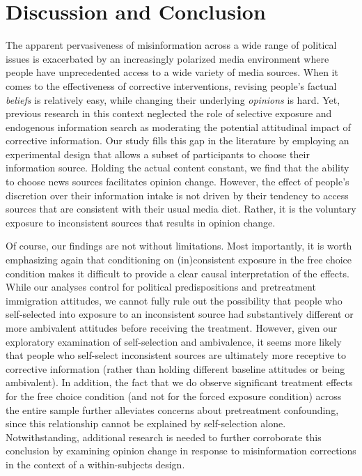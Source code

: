 \documentclass[
  12pt,
]{article}
\begin{document}
\hypertarget{discussion-and-conclusion}{%
\section{Discussion and Conclusion}\label{discussion-and-conclusion}}

The apparent pervasiveness of misinformation across a wide range of
political issues is exacerbated by an increasingly polarized media
environment where people have unprecedented access to a wide variety of
media sources. When it comes to the effectiveness of corrective
interventions, revising people's factual \emph{beliefs} is relatively
easy, while changing their underlying \emph{opinions} is hard. Yet,
previous research in this context neglected the role of selective
exposure and endogenous information search as moderating the potential
attitudinal impact of corrective information. Our study fills this gap
in the literature by employing an experimental design that allows a
subset of participants to choose their information source. Holding the
actual content constant, we find that the ability to choose news sources
facilitates opinion change. However, the effect of people's discretion
over their information intake is not driven by their tendency to access
sources that are consistent with their usual media diet. Rather, it is
the voluntary exposure to inconsistent sources that results in opinion
change.

Of course, our findings are not without limitations. Most importantly,
it is worth emphasizing again that conditioning on (in)consistent
exposure in the free choice condition makes it difficult to provide a
clear causal interpretation of the effects. While our analyses control
for political predispositions and pretreatment immigration attitudes, we
cannot fully rule out the possibility that people who self-selected into
exposure to an inconsistent source had substantively different or more
ambivalent attitudes before receiving the treatment. However, given our
exploratory examination of self-selection and ambivalence, it seems more
likely that people who self-select inconsistent sources are ultimately
more receptive to corrective information (rather than holding different
baseline attitudes or being ambivalent). In addition, the fact that we
do observe significant treatment effects for the free choice condition
(and not for the forced exposure condition) across the entire sample
further alleviates concerns about pretreatment confounding, since this
relationship cannot be explained by self-selection alone.
Notwithstanding, additional research is needed to further corroborate
this conclusion by examining opinion change in response to
misinformation corrections in the context of a within-subjects design.
\end{document}
